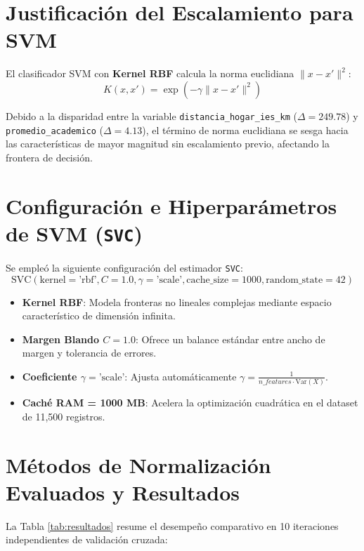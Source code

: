 \documentclass[11pt,a4paper]{article}
\begin{document}
\section{Justificación del Escalamiento para SVM}

El clasificador SVM con \textbf{Kernel RBF} calcula la norma euclidiana $\|x - x'\|^2$:
\begin{equation}
K(x, x') = \exp\left(-\gamma \|x - x'\|^2\right)
\end{equation}

Debido a la disparidad entre la variable \texttt{distancia\_hogar\_ies\_km} ($\Delta = 249.78$) y \texttt{promedio\_academico} ($\Delta = 4.13$), el término de norma euclidiana se sesga hacia las características de mayor magnitud sin escalamiento previo, afectando la frontera de decisión.

\section{Configuración e Hiperparámetros de SVM (\texttt{SVC})}

Se empleó la siguiente configuración del estimador \texttt{SVC}:
\begin{equation}
\text{SVC}(\text{kernel}=\text{'rbf'}, C=1.0, \gamma=\text{'scale'}, \text{cache\_size}=1000, \text{random\_state}=42)
\end{equation}

\begin{itemize}
    \item \textbf{Kernel RBF}: Modela fronteras no lineales complejas mediante espacio característico de dimensión infinita.
    \item \textbf{Margen Blando $C=1.0$}: Ofrece un balance estándar entre ancho de margen y tolerancia de errores.
    \item \textbf{Coeficiente $\gamma=\text{'scale'}$}: Ajusta automáticamente $\gamma = \frac{1}{n\_features \cdot \text{Var}(X)}$.
    \item \textbf{Caché RAM = 1000 MB}: Acelera la optimización cuadrática en el dataset de 11,500 registros.
\end{itemize}

\section{Métodos de Normalización Evaluados y Resultados}

La Tabla \ref{tab:resultados} resume el desempeño comparativo en 10 iteraciones independientes de validación cruzada:
\end{document}
